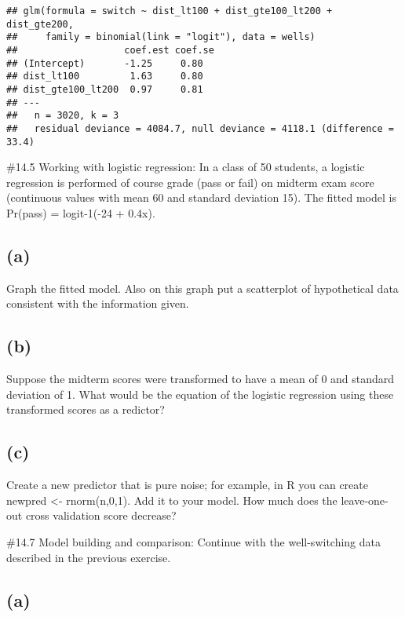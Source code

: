 \documentclass[
]{article}
\begin{document}
\begin{verbatim}
## glm(formula = switch ~ dist_lt100 + dist_gte100_lt200 + dist_gte200, 
##     family = binomial(link = "logit"), data = wells)
##                   coef.est coef.se
## (Intercept)       -1.25     0.80  
## dist_lt100         1.63     0.80  
## dist_gte100_lt200  0.97     0.81  
## ---
##   n = 3020, k = 3
##   residual deviance = 4084.7, null deviance = 4118.1 (difference = 33.4)
\end{verbatim}

\#14.5 Working with logistic regression: In a class of 50 students, a
logistic regression is performed of course grade (pass or fail) on
midterm exam score (continuous values with mean 60 and standard
deviation 15). The fitted model is Pr(pass) = logit-1(-24 + 0.4x).

\hypertarget{a-5}{%
\subsection{(a)}\label{a-5}}

Graph the fitted model. Also on this graph put a scatterplot of
hypothetical data consistent with the information given.

\hypertarget{b-5}{%
\subsection{(b)}\label{b-5}}

Suppose the midterm scores were transformed to have a mean of 0 and
standard deviation of 1. What would be the equation of the logistic
regression using these transformed scores as a redictor?

\hypertarget{c-1}{%
\subsection{(c)}\label{c-1}}

Create a new predictor that is pure noise; for example, in R you can
create newpred \textless- rnorm(n,0,1). Add it to your model. How much
does the leave-one-out cross validation score decrease?

\#14.7 Model building and comparison: Continue with the well-switching
data described in the previous exercise.

\hypertarget{a-6}{%
\subsection{(a)}\label{a-6}}
\end{document}
